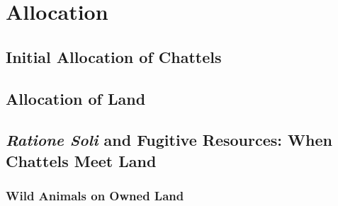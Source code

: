 \chapter{Allocation}






\section{Initial Allocation of Chattels}





\begin{questions}

\end{questions}




\begin{questions}

\end{questions}






\begin{questions}

\end{questions}


\section{Allocation of Land}

















\begin{questions}

\end{questions}


\section{\textit{Ratione Soli} and Fugitive Resources: When Chattels Meet Land}


\subsection{Wild Animals on Owned Land}


